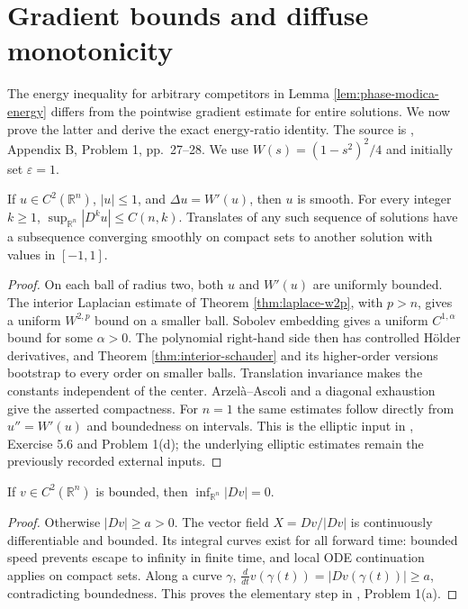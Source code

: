 \chapter{Gradient bounds and diffuse monotonicity}\label{sec:phase-monotonicity}
The energy inequality for arbitrary competitors in Lemma \ref{lem:phase-modica-energy} differs from the pointwise gradient estimate for entire solutions. We now prove the latter and derive the exact energy-ratio identity. The source is \cite{ChAC}, Appendix B, Problem 1, pp.~27--28. We use $W(s)=(1-s^2)^2/4$ and initially set $\varepsilon=1$.

\begin{lemma}\label{lem:phase-entire-estimates}
If $u\in C^2(\mathbb R^n)$, $|u|\leq1$, and $\Delta u=W'(u)$, then $u$ is smooth. For every integer $k\geq1$, $\sup_{\mathbb R^n}|D^ku|\leq C(n,k)$. Translates of any such sequence of solutions have a subsequence converging smoothly on compact sets to another solution with values in $[-1,1]$.
\end{lemma}
\begin{proof}
On each ball of radius two, both $u$ and $W'(u)$ are uniformly bounded. The interior Laplacian estimate of Theorem \ref{thm:laplace-w2p}, with $p>n$, gives a uniform $W^{2,p}$ bound on a smaller ball. Sobolev embedding gives a uniform $C^{1,\alpha}$ bound for some $\alpha>0$. The polynomial right-hand side then has controlled Hölder derivatives, and Theorem \ref{thm:interior-schauder} and its higher-order versions bootstrap to every order on smaller balls. Translation invariance makes the constants independent of the center. Arzel\`a--Ascoli and a diagonal exhaustion give the asserted compactness. For $n=1$ the same estimates follow directly from $u''=W'(u)$ and boundedness on intervals. This is the elliptic input in \cite{ChAC}, Exercise 5.6 and Problem 1(d); the underlying elliptic estimates remain the previously recorded external inputs.
\end{proof}

\begin{lemma}\label{lem:phase-small-gradient}
If $v\in C^2(\mathbb R^n)$ is bounded, then $\inf_{\mathbb R^n}|Dv|=0$.
\end{lemma}
\begin{proof}
Otherwise $|Dv|\geq a>0$. The vector field $X=Dv/|Dv|$ is continuously differentiable and bounded. Its integral curves exist for all forward time: bounded speed prevents escape to infinity in finite time, and local ODE continuation applies on compact sets. Along a curve $\gamma$,
$\frac d{dt}v(\gamma(t))=|Dv(\gamma(t))|\geq a$, contradicting boundedness. This proves the elementary step in \cite{ChAC}, Problem 1(a).
\end{proof}


